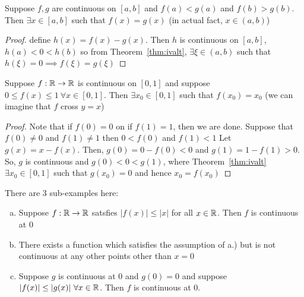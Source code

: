 \begin{example}
    Suppose $f, g$ are continuous on $\left[a, b\right]$ and $f(a) < g(a)$ and $f(b) > g(b)$.
    Then $\exists x \in \left[a, b\right]$ such that $f(x) = g(x)$ (in actual fact, $x \in (a, b)$)
\end{example}

\begin{proof}
    define $h(x) = f(x) - g(x)$. Then $h$ is continuous on $\left[a, b\right]$,
    $h(a) < 0 < h(b)$ so from Theorem~\ref{thm:ivalt}, $\exists \xi \in (a, b)$ such that
    $h(\xi) = 0 \implies f(\xi)=g(\xi)$
\end{proof}

\begin{example}
    Suppose $f: \mathbb R \to \mathbb R$ is continuous on $\left[0, 1\right]$ and suppose 
    $0 \leq f(x) \leq 1\ \forall x \in \left[0, 1\right]$. Then $\exists x_0 \in \left[0, 1\right]$ 
    such that $f(x_0) = x_0$ (we can imagine that $f$ cross $y = x$)
\end{example}

\begin{proof}
    Note that if $f(0) = 0$ on if $f(1) = 1$, then we are done.
    Suppose that $f(0) \neq 0$ and $f(1) \neq 1$ then $0 < f(0)$ and $f(1) < 1$
    Let $g(x) = x - f(x)$. Then, $g(0) = 0 - f(0) < 0$ and $g(1) = 1 - f(1) > 0$.
    So, $g$ is continuous and $g(0) < 0 < g(1)$, where Theorem~\ref{thm:ivalt} 
    $\exists x_0 \in \left[0, 1\right]$ such that $g(x_0) = 0$ and hence $x_0 =f(x_0)$
\end{proof}

\begin{example}
    There are 3 sub-examples here:
    \begin{enumerate}[(a)]
        \item Suppose $f: \mathbb R \to \mathbb R$ satsfies $|f(x)| \leq |x|$ for all $x \in \mathbb R$. Then $f$ is continuous at $0$
        \item There exists a function which satisfies the assumption of a.) but is not continuous at any other points
        other than $x = 0$
        \item Suppose $g$ is continuous at $0$ and $g(0) = 0$ and suppose $|f(x)| \leq |g(x)|\ \forall x \in \mathbb R$.
        Then $f$ is continuous at $0$.
    \end{enumerate}
\end{example}


